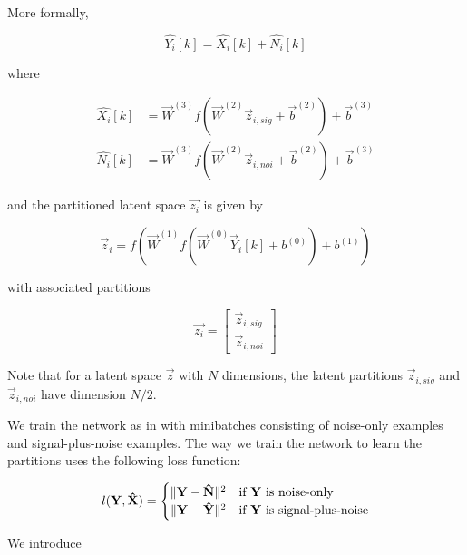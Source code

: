 More formally,

\begin{equation}
\hat{Y_i}[k] = \hat{X_i}[k] + \hat{N_i}[k]
\end{equation}

where

\begin{align}
\hat{X_i}[k] &= \vec{W}^{(3)} f(\vec{W}^{(2)} \vec{z}_{i,sig} + \vec{b}^{(2)}) + \vec{b}^{(3)}\\
\hat{N_i}[k] &= \vec{W}^{(3)} f(\vec{W}^{(2)} \vec{z}_{i,noi} + \vec{b}^{(2)}) + \vec{b}^{(3)}
\end{align}

and the partitioned latent space $\vec{z_i}$ is given by

\begin{equation}
\vec{z}_i = f(\vec{W}^{(1)} f(\vec{W}^{(0)} \vec{Y}_{i}[k] + b^{(0)}) + b^{(1)})
\end{equation}

with associated partitions

\begin{equation}
\vec{z_i} =
    \left[
    \begin{array}{c}
        \vec{z}_{i,sig} \\
        \hline
        \vec{z}_{i,noi}
    \end{array}
    \right]
\end{equation}

Note that for a latent space $\vec{z}$ with $N$ dimensions, the latent partitions $\vec{z}_{i,sig}$ and $\vec{z}_{i,noi}$ have dimension $N/2$.

We train the network as in \cite{stow} with minibatches consisting of noise-only examples and signal-plus-noise examples. The way we train the network to learn the partitions uses the following loss function:

\begin{equation}
l(\vec{Y}, \vec{\hat{X}}) =
    \begin{cases}
        \hfill \norm{\vec{Y}-\vec{\hat{N}}}^{2} \hfill & \text{if $\vec{Y}$ is noise-only}\\
        \hfill \norm{\vec{Y}-\vec{\hat{Y}}}^{2} & \text{if $\vec{Y}$ is signal-plus-noise}
    \end{cases}
\end{equation}

We introduce
